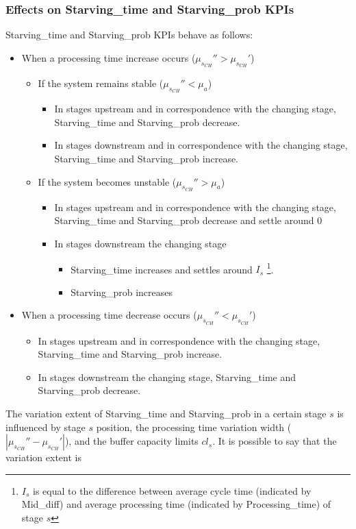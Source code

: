 \subsubsection{Effects on Starving\_time and Starving\_prob KPIs}
Starving\_time and Starving\_prob KPIs behave as follows:
\begin{itemize}
\item When a processing time increase occurs ($\mu_{s_{CH}}''>\mu_{s_{CH}}'$)
\begin{itemize}
\item If the system remains stable ($\mu_{s_{CH}}''<\mu_a$)
\begin{itemize}
\item In stages upstream and in correspondence with the changing stage, Starving\_time and Starving\_prob decrease.
\item In stages downstream and in correspondence with the changing stage, Starving\_time and Starving\_prob increase.
\end{itemize}
\item If the system becomes unstable ($\mu_{s_{CH}}''>\mu_a$)
\begin{itemize}
\item In stages upstream and in correspondence with the changing stage, Starving\_time and Starving\_prob decrease and settle around $0$  
\item In stages downstream the changing stage
\begin{itemize}
\item Starving\_time increases and settles around $I_s$ \footnote{$I_s$ is equal to the difference between average cycle time (indicated by Mid\_diff) and average processing time (indicated by Processing\_time) of stage $s$}.
\item Starving\_prob increases 
\end{itemize}
\end{itemize}
\end{itemize}
\item When a processing time decrease occurs ($\mu_{s_{CH}}''<\mu_{s_{CH}}'$)
\begin{itemize}
\item In stages upstream and in correspondence with the changing stage, Starving\_time and Starving\_prob increase.
\item In stages downstream the changing stage, Starving\_time and Starving\_prob decrease.
\end{itemize}
\end{itemize}
The variation extent of Starving\_time and Starving\_prob in a certain stage $s$ is influenced by stage $s$ position, the processing time variation width ($|\mu_{s_{CH}}''-\mu_{s_{CH}}'|$), and the buffer capacity limits $cl_s$. It is possible to say that the variation extent is 
